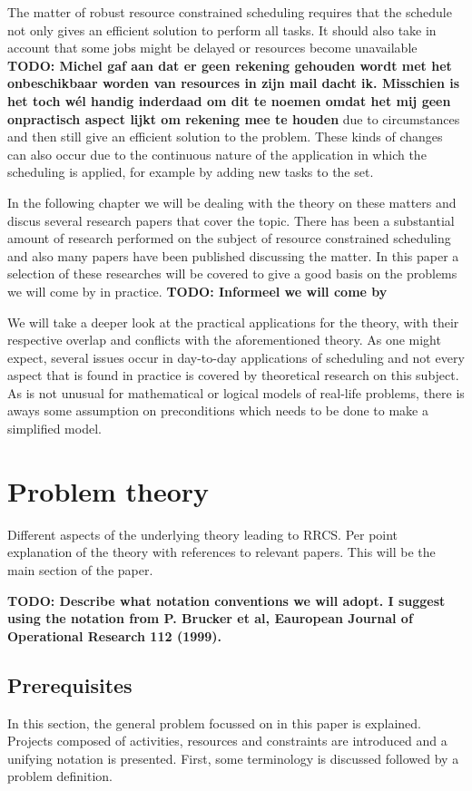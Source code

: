 \documentclass{article}
\newcommand{\TODO}[1]{{\color{red}\textbf{TODO: #1}}}
\begin{document}
The matter of robust resource constrained scheduling requires that the schedule not only gives an efficient solution to perform all tasks. It  should also take in account that some jobs might be delayed or resources become unavailable \TODO{Michel gaf aan dat er geen rekening gehouden wordt met het onbeschikbaar worden van resources in zijn mail dacht ik. Misschien is het toch wél handig inderdaad om dit te noemen omdat het mij geen onpractisch aspect lijkt om rekening mee te houden} due to circumstances and then still give an efficient solution to the problem. These kinds of changes can also occur due to the continuous nature of the application in which the scheduling is applied, for example by adding new tasks to the set.

In the following chapter we will be dealing with the theory on these matters and discus several research papers that cover the topic. There has been a substantial amount of research performed on the subject of resource constrained scheduling and also many papers have been published discussing the matter. In this paper a selection of these researches will be covered to give a good basis on the problems we will come by in practice. \TODO{Informeel we will come by}

We will take a deeper look at the practical applications for the theory, with their respective overlap and conflicts with the aforementioned theory. As one might expect, several issues occur in day-to-day applications of scheduling and not every aspect that is found in practice is covered by theoretical research on this subject. As is not unusual for mathematical or logical models of real-life problems, there is aways some assumption on preconditions which needs to be done to make a simplified model.

\newpage

\section{Problem theory}

Different aspects of the underlying theory leading to RRCS.  Per point explanation of the theory with references to relevant papers. This will be the main section of the paper.

\TODO{Describe what notation conventions we will adopt. I suggest using the notation from P. Brucker et al, Eauropean Journal of Operational Research 112 (1999). }

\subsection{Prerequisites}
In this section, the general problem focussed on in this paper is explained. Projects composed of activities, resources and constraints are introduced and a unifying notation is presented. First, some terminology is discussed followed by a problem definition.
\end{document}
